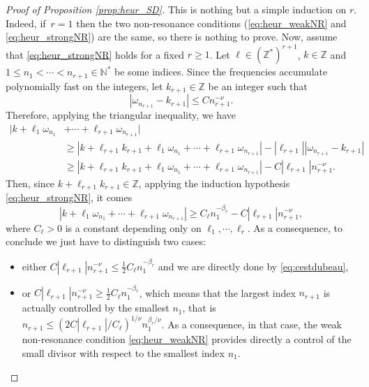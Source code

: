 \documentclass[11pt]{article}
\theoremstyle{definition}
\begin{document}
\begin{proof}[Proof of Proposition \ref{prop:heur_SD}] This is nothing but a simple induction on $r$. Indeed, if~$r=1$ then the two non-resonance conditions (\eqref{eq:heur_weakNR} and \eqref{eq:heur_strongNR}) are the same, so there is nothing to prove. Now, assume that \eqref{eq:heur_strongNR} holds for a fixed $r\geq 1$. Let $\ell \in (\mathbb{Z}^*)^{r+1}$, $k \in \mathbb{Z}$ and $1\leq n_1< \cdots < n_{r+1} \in \mathbb{N}^*$ be some indices. Since the frequencies accumulate polynomially fast on the integers, let $k_{r+1} \in \mathbb{Z}$ be an integer such that
\[
|\omega_{n_{r+1}} - k_{r+1} | \leq C n_{r+1}^{-\nu}.
\]
Therefore, applying the triangular inequality, we have
\begin{equation*}
\begin{split}
|k+\ell_1 \omega_{n_1}& + \cdots + \ell_{r+1} \omega_{n_{r+1}}| \\ &\geq |k+\ell_{r+1} k_{r+1}+\ell_1 \omega_{n_1} + \cdots + \ell_{r+1} \omega_{n_{r+1}}|- |\ell_{r+1}| |\omega_{n_{r+1}} - k_{r+1} | \\
&\geq |k+\ell_{r+1} k_{r+1}+\ell_1 \omega_{n_1} + \cdots + \ell_{r+1} \omega_{n_{r+1}}|- C |\ell_{r+1}| n_{r+1}^{-\nu}.
\end{split}
\end{equation*}
Then, since $k+\ell_{r+1} k_{r+1} \in \mathbb{Z}$, applying the induction hypothesis \eqref{eq:heur_strongNR}, it comes
\begin{equation}
\label{eq:cestdubeau}
|k+\ell_1 \omega_{n_1} + \cdots + \ell_{r+1} \omega_{n_{r+1}}| \geq C_\ell n_1^{-\beta_r} - C | \ell_{r+1}| n_{r+1}^{-\nu},
\end{equation}
where $C_\ell >0$ is a constant depending only on $\ell_1,\cdots,\ell_r$. As a consequence, to conclude we just have to distinguish two cases:
\begin{itemize}
\item either $C | \ell_{r+1}| n_{r+1}^{-\nu} \leq \frac12 C_\ell n_1^{-\beta_r}$ and we are directly done by \eqref{eq:cestdubeau},
\item or $C | \ell_{r+1}| n_{r+1}^{-\nu} \geq \frac12 C_\ell n_1^{-\beta_r}$, which means that the largest index $n_{r+1}$ is actually controlled by the smallest $n_1$, that is $ n_{r+1} \leq (2 C | \ell_{r+1}| / C_\ell)^{1/\nu} n_1^{\beta_r/\nu}$. As a consequence, in that case, the weak non-resonance condition \eqref{eq:heur_weakNR} provides directly a control of the small divisor with respect to the smallest index $n_1$.\qedhere
\end{itemize}
\end{proof}
\end{document}
